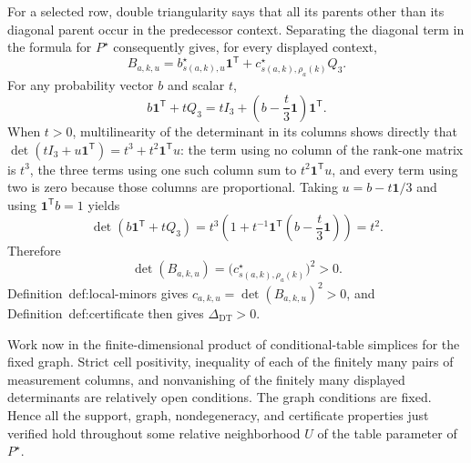 For a selected row, double triangularity says that all its parents other than its diagonal parent occur in the predecessor context.  Separating the diagonal term in the formula for \(P^{\star}\) consequently gives, for every displayed context,
\[
 B_{a,k,u}
 =b^{\star}_{s(a,k),u}\mathbf 1^{\mathsf T}
  +c^{\star}_{s(a,k),\rho_a(k)}Q_3.
\]
For any probability vector \(b\) and scalar \(t\),
\[
 b\mathbf 1^{\mathsf T}+tQ_3
 =tI_3+\left(b-\frac t3\mathbf 1\right)\mathbf 1^{\mathsf T}.
\]
When \(t>0\), multilinearity of the determinant in its columns shows directly that
\(\det(tI_3+u\mathbf 1^{\mathsf T})=t^3+t^2\mathbf 1^{\mathsf T}u\): the term using no column of the rank-one matrix is \(t^3\), the three terms using one such column sum to \(t^2\mathbf 1^{\mathsf T}u\), and every term using two is zero because those columns are proportional.  Taking \(u=b-t\mathbf 1/3\) and using \(\mathbf 1^{\mathsf T}b=1\) yields
\[
 \det\!\left(b\mathbf 1^{\mathsf T}+tQ_3\right)
 =t^3\left(1+t^{-1}\mathbf 1^{\mathsf T}
       \left(b-\frac t3\mathbf 1\right)\right)
 =t^2.
\]
Therefore
\[
 \det(B_{a,k,u})
 =\bigl(c^{\star}_{s(a,k),\rho_a(k)}\bigr)^2>0.
\]
Definition~\textnormal{def:local-minors} gives \(c_{a,k,u}=\det(B_{a,k,u})^2>0\), and Definition~\textnormal{def:certificate} then gives \(\Delta_{\mathrm{DT}}>0\).

Work now in the finite-dimensional product of conditional-table simplices for the fixed graph.  Strict cell positivity, inequality of each of the finitely many pairs of measurement columns, and nonvanishing of the finitely many displayed determinants are relatively open conditions.  The graph conditions are fixed.  Hence all the support, graph, nondegeneracy, and certificate properties just verified hold throughout some relative neighborhood \(U\) of the table parameter of \(P^{\star}\).


